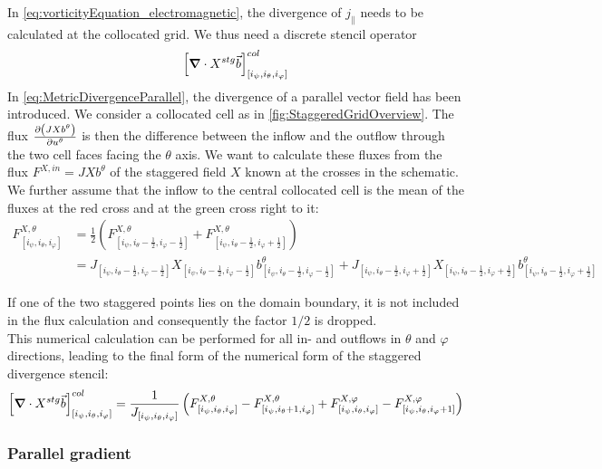 In \autoref{eq:vorticityEquation_electromagnetic}, the divergence of $j_\parallel$ needs to be calculated at the collocated grid. We thus need a discrete stencil operator 
$$\left[\grad\cdot X^{stg}\vec{b}\right]^{col}_{[i_\psi,i_\theta, i_\varphi]}$$
In \autoref{eq:MetricDivergenceParallel}, the divergence of a parallel vector field has been introduced. We consider a collocated cell as in \autoref{fig:StaggeredGridOverview}. The flux $\pdv{\left(J X b^\theta\right)}{u^\theta}$ is then the difference between the inflow and the outflow through the two cell faces facing the $\theta$ axis. We want to calculate these fluxes from the flux $F^{X,in} = JXb^\theta$ of the staggered field $X$ known at the crosses in the schematic. We further assume that the inflow to the central collocated cell is the mean of the fluxes at the red cross and at the green cross right to it:
\begin{align*}
	F_{[i_\psi,i_\theta, i_\varphi]}^{X,\theta} &= \frac{1}{2}\left(F_{[i_\psi,i_\theta-\frac{1}{2}, i_\varphi-\frac{1}{2}]}^{X,\theta} + F_{[i_\psi,i_\theta-\frac{1}{2}, i_\varphi+\frac{1}{2}]}^{X,\theta} \right) \\
	&= J_{[i_\psi,i_\theta-\frac{1}{2}, i_\varphi-\frac{1}{2}]}X_{[i_\psi,i_\theta-\frac{1}{2}, i_\varphi-\frac{1}{2}]}b_{[i_\psi,i_\theta-\frac{1}{2}, i_\varphi-\frac{1}{2}]}^\theta + J_{[i_\psi,i_\theta-\frac{1}{2}, i_\varphi+\frac{1}{2}]}X_{[i_\psi,i_\theta-\frac{1}{2}, i_\varphi+\frac{1}{2}]}b_{[i_\psi,i_\theta-\frac{1}{2}, i_\varphi+\frac{1}{2}]}^\theta
\end{align*}

If one of the two staggered points lies on the domain boundary, it is not included in the flux calculation and consequently the factor $1/2$ is dropped. \\

This numerical calculation can be performed for all in- and outflows in $\theta$ and $\varphi$ directions, leading to the final form of the numerical form of the staggered divergence stencil: 
\begin{equation}
	\label{eq:NumericalStaggeredDivergenceStencil}
	\left[\grad\cdot X^{stg}\vec{b}\right]^{col}_{[i_\psi,i_\theta, i_\varphi]} = \frac{1}{J_{[i_\psi,i_\theta, i_\varphi]}} \left(F_{[i_\psi,i_\theta, i_\varphi]}^{X,\theta}-F_{[i_\psi,i_\theta+1, i_\varphi]}^{X,\theta}+F_{[i_\psi,i_\theta, i_\varphi]}^{X,\varphi}-F_{[i_\psi,i_\theta, i_\varphi+1]}^{X,\varphi}\right)
\end{equation}

\subsubsection{Parallel gradient}

